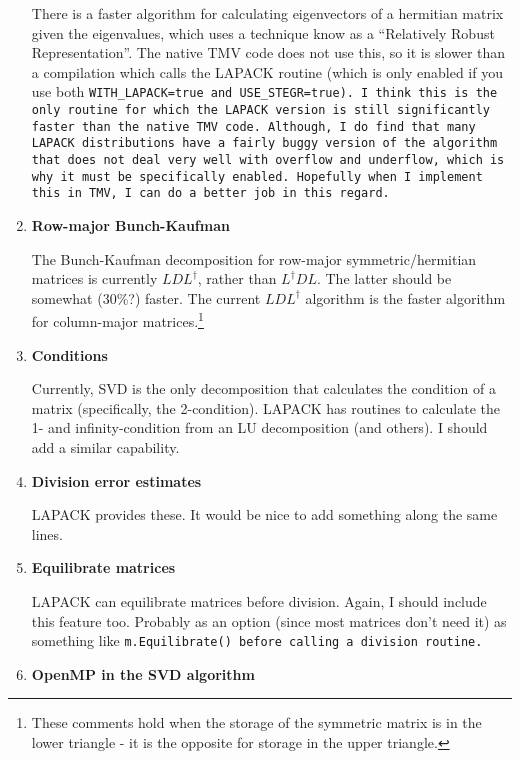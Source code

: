 \begin{enumerate}
There is a faster algorithm for calculating eigenvectors of a hermitian
matrix given the eigenvalues, which uses a technique know as
a ``Relatively Robust Representation''.  The native TMV
code does not use this, so it is slower than a compilation which calls
the LAPACK routine (which is only enabled if you use both 
\tt{WITH_LAPACK=true} and \tt{USE_STEGR=true}).
I think this is the only routine for which the LAPACK version is still significantly
faster than the native TMV code.  Although, I do find that many LAPACK distributions have a fairly buggy version of the algorithm that does not deal very well with overflow and underflow, which is why it must be specifically enabled.  Hopefully when I implement this in TMV, I can do a better job in this regard.

\item
\textbf{Row-major Bunch-Kaufman}

The Bunch-Kaufman decomposition for row-major symmetric/hermitian
matrices is currently $L D L^\dagger$, rather than $L^\dagger D L$.  
The latter should be somewhat (30\%?) faster.  The current $L D L^\dagger$
algorithm is the faster algorithm for column-major matrices.\footnote{
These comments hold when the storage of the symmetric matrix is in the 
lower triangle - it is the opposite for storage in the upper triangle.}

\item
\textbf{Conditions}

Currently, SVD is the only decomposition that calculates the condition
of a matrix (specifically, the 2-condition).  
LAPACK has routines to calculate the 1- and infinity-condition
from an LU decomposition (and others).  I should add a similar capability.

\item
\textbf{Division error estimates}

LAPACK provides these.  It would be nice to add something along the same lines.

\item
\textbf{Equilibrate matrices}

LAPACK can equilibrate matrices before division.  Again, I should include this
feature too.  Probably as an option (since most matrices don't need it)
as something like \tt{m.Equilibrate()} before calling a division routine.

\item
\textbf{OpenMP in the SVD algorithm}


\end{enumerate}
